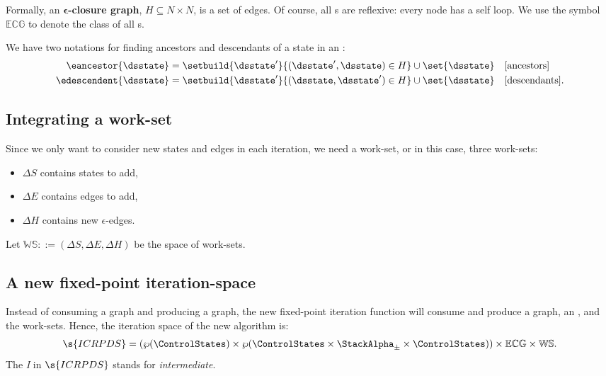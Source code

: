 Formally, an \textbf{$\boldsymbol \epsilon$-closure graph}, $H \subseteq N \times N$, is
a set of edges.
Of course, all \ecg s are reflexive: every node has a self loop.
We use the symbol $\mathbb{ECG}$ to denote the class of all \ecg s.


We have two notations for finding ancestors and descendants of a state
in an \ecg{}:
\begin{align*}
  \eancestor{\dsstate} &= \setbuild{ \dsstate' }{ (\dsstate',\dsstate) \in H } \cup \set{\dsstate}
  && \text{[ancestors]}
  \\
  \edescendent{\dsstate} &= \setbuild{ \dsstate' }{ (\dsstate,\dsstate') \in H } \cup \set{\dsstate}
  && \text{[descendants]}
  \text.
\end{align*}


\subsection{Integrating a work-set}
Since we only want to consider new states and edges in each iteration,
we need a work-set, or in this case, three work-sets:
\begin{itemize}
\item{$\Delta S$ contains states to add,}
\item{$\Delta E$ contains edges to add,}
\item{$\Delta H$ contains new $\epsilon$-edges.}
\end{itemize}
Let $\mathbb{WS} ::= (\Delta S, \Delta E, \Delta H)$ be the space of work-sets.

\subsection{A new fixed-point iteration-space}
Instead of consuming a graph and producing a graph, the new fixed-point iteration function will consume and produce a graph,
an \ecg{}, and the work-sets.
Hence, the iteration space of the new algorithm is:
\begin{equation*}
  \s{ICRPDS} = (\wp(\ControlStates) \times \wp(\ControlStates \times \StackAlpha_\pm \times \ControlStates)) \times \mathbb{ECG}
  \times \mathbb{WS}
  \text.
\end{equation*}
The \emph{I} in $\s{ICRPDS}$ stands for \emph{intermediate}.



